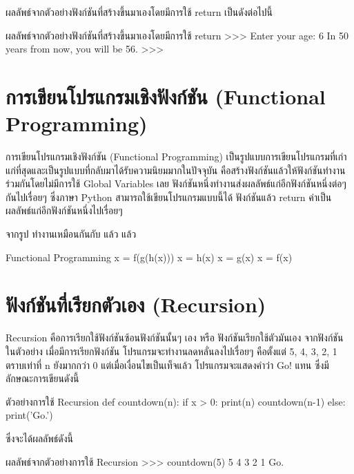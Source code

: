 ผลลัพธ์จากตัวอย่างฟังก์ชันที่สร้างขึ้นมาเองโดยมีการใช้ return เป็นดังต่อไปนี้

\begin{codelist}{ผลลัพธ์จากตัวอย่างฟังก์ชันที่สร้างขึ้นมาเองโดยมีการใช้ return}{}
>>>
Enter your age: 6
In 50 years from now, you will be  56.
>>> 
\end{codelist}

\section{การเขียนโปรแกรมเชิงฟังก์ชัน (Functional Programming)}


การเขียนโปรแกรมเชิงฟังก์ชัน (Functional Programming) เป็นรูปแบบการเขียนโปรแกรมที่เก่าแก่ที่สุดและเป็นรูปแบบที่กลับมาได้รับความนิยมมากในปัจจุบัน คือสร้างฟังก์ชันแล้วให้ฟังก์ชันทำงานร่วมกันโดยไม่มีการใช้ Global Variables เลย ฟังก์ชันหนึ่งทำงานส่งผลลัพธ์แก่อีกฟังก์ชันหนึ่งต่อๆ กันไปเรื่อยๆ ซึ่งภาษา Python สามารถใช้เขียนโปรแกรมแบบนี้ได้ ฟังก์ชันแล้ว return ค่าเป็นผลลัพธ์แก่อีกฟังก์ชันหนึ่งไปเรื่อยๆ  

จากรูป   ทำงานเหมือนกันกับ  แล้ว   แล้ว  

\begin{codelist}{Functional Programming}{}
x = f(g(h(x)))
x = h(x)
x = g(x)
x = f(x)
\end{codelist}


\section{ฟังก์ชันที่เรียกตัวเอง (Recursion)}

Recursion คือการเรียกใช้ฟังก์ชันซ้อนฟังก์ชันนั้นๆ เอง หรือ ฟังก์ชันเรียกใช้ตัวมันเอง จากฟังก์ชัน   ในตัวอย่าง เมื่อมีการเรียกฟังก์ชัน   โปรแกรมจะทำงานลดหลั่นลงไปเรื่อยๆ คือตั้งแต่ 5, 4, 3, 2, 1 ตราบเท่าที่ n ยังมากกว่า 0 แต่เมื่อเงื่อนไขเป็นเท็จแล้ว โปรแกรมจะแสดงคำว่า Go! แทน ซึ่งมีลักษณะการเขียนดังนี้


\begin{codelist}{ตัวอย่างการใช้ Recursion}{}
def countdown(n):
    if x > 0:
        print(n)
        countdown(n-1)
    else:
        print('Go.')
\end{codelist}

ซึ่งจะได้ผลลัพธ์ดังนี้
\begin{codelist}{ผลลัพธ์จากตัวอย่างการใช้ Recursion}{}
>>> countdown(5)
5
4
3
2
1
Go.
\end{codelist}

